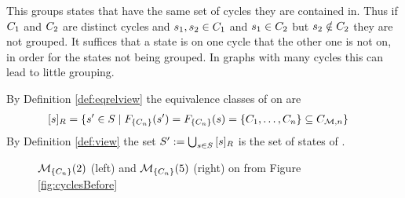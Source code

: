 \documentclass[preview]{standalone}
\begin{document}
This \viewN groups states that have the same set of cycles they are contained in. Thus if ${C}_1$ and ${C}_2$ are distinct cycles and ${s}_1, {s}_2 \in {C}_1$ and ${s}_1 \in {C}_2$ but ${s}_2 \notin {C}_2$ they are not grouped. It suffices that a state is on one cycle that the other one is not on, in order for the states not being grouped. In graphs with many cycles this can lead to little grouping.

\noindent By Definition \ref{def:eqrelview} the equivalence classes of \eqrelview on \states are
\begin{align*}
	\eqclassv &= \{\state' \in \states \mid \gfctexactcycle(\state') = \gfctexactcycle(\state) = \{\cycle_1, \dots, \cycle_n\} \subseteq \cycleset\}
\end{align*}
\noindent By Definition \ref{def:view} the set ${S}' := \bigcup_{{s} \in {S}} {{[{s}]_{{R}}}}$ is the set of states of \viewexactcycle.


\begin{figure}[!htb]
	\begin{minipage}{.5\textwidth}
		
	\end{minipage}%
	\begin{minipage}{.5\textwidth}
		
	\end{minipage}
	\caption{\viewNC ${{{{{\mathcal{M}}}}_{{\{{C}_n\}}}}}(2)$ (left) and \viewN ${{{{{\mathcal{M}}}}_{{\{{C}_n\}}}}}(5)$ (right) on \chgph from Figure \ref{fig:cyclesBefore}}
	\label{fig:cycleAfterExtact} 
\end{figure}
\end{document}
